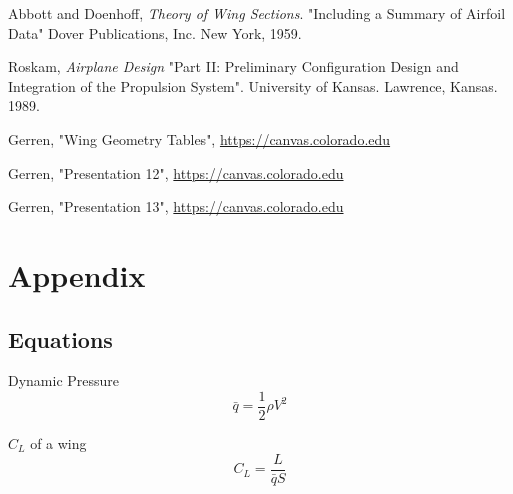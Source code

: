 \documentclass[conf]{new-aiaa}
\begin{document}
\begin{thebibliography}{99}
 Abbott and Doenhoff, \textit{Theory of Wing Sections}. "Including a Summary of Airfoil Data" Dover Publications, Inc. New York, 1959.

 Roskam, \textit{Airplane Design} "Part II: Preliminary Configuration Design and Integration of the Propulsion System". University of Kansas. Lawrence, Kansas. 1989.

 Gerren, "Wing Geometry Tables", \url{https://canvas.colorado.edu}

 Gerren, "Presentation 12", \url{https://canvas.colorado.edu}

 Gerren, "Presentation 13", \url{https://canvas.colorado.edu}

\end{thebibliography}

\section*{Appendix}

\subsection*{Equations}
Dynamic Pressure
\begin{equation}
    \bar{q} = \frac{1}{2} \rho V^2
    \label{eq:q_bar}
\end{equation}

$C_L$ of a wing
\begin{equation}
    C_L = \frac{L}{ \bar{q} S }
    \label{eq:CL}
\end{equation}
\end{document}
